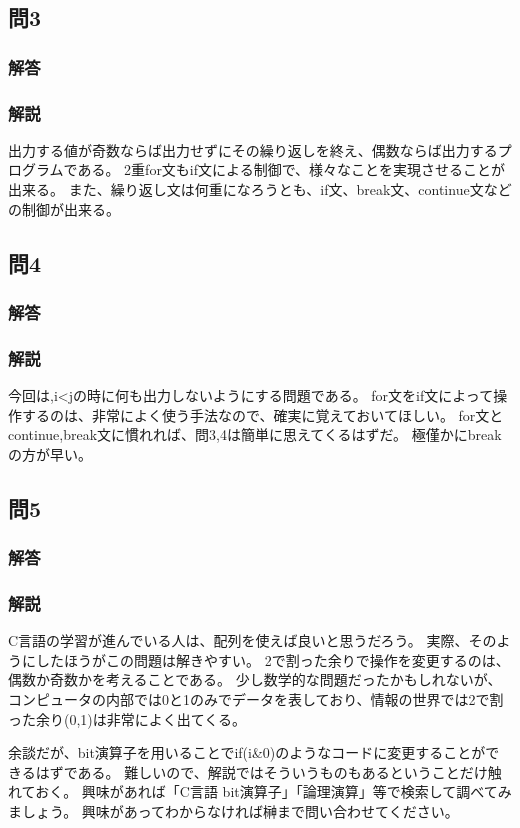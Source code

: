 \subsection{問3}
\subsubsection{解答}

\subsubsection{解説}
出力する値が奇数ならば出力せずにその繰り返しを終え、偶数ならば出力するプログラムである。
2重for文もif文による制御で、様々なことを実現させることが出来る。
また、繰り返し文は何重になろうとも、if文、break文、continue文などの制御が出来る。


\subsection{問4}
\subsubsection{解答}

\subsubsection{解説}
今回は,i<jの時に何も出力しないようにする問題である。
for文をif文によって操作するのは、非常によく使う手法なので、確実に覚えておいてほしい。
for文とcontinue,break文に慣れれば、問3,4は簡単に思えてくるはずだ。
極僅かにbreakの方が早い。


\subsection{問5}
\subsubsection{解答}

\subsubsection{解説}
C言語の学習が進んでいる人は、配列を使えば良いと思うだろう。
実際、そのようにしたほうがこの問題は解きやすい。
2で割った余りで操作を変更するのは、偶数か奇数かを考えることである。
少し数学的な問題だったかもしれないが、コンピュータの内部では0と1のみでデータを表しており、情報の世界では2で割った余り(0,1)は非常によく出てくる。

余談だが、bit演算子を用いることでif(i&0)のようなコードに変更することができるはずである。
難しいので、解説ではそういうものもあるということだけ触れておく。
興味があれば「C言語 bit演算子」「論理演算」等で検索して調べてみましょう。
興味があってわからなければ榊まで問い合わせてください。

